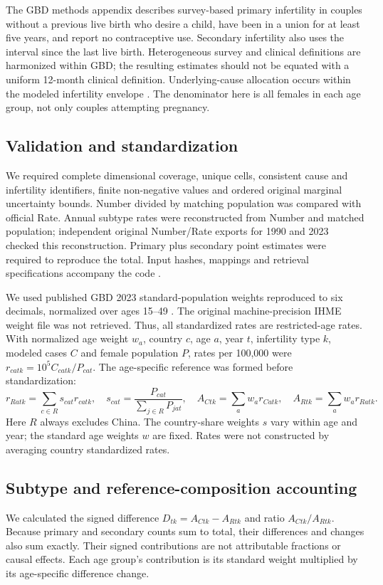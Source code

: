 \documentclass[11pt,a4paper]{article}
\begin{document}
The GBD methods appendix describes survey-based primary infertility in couples without a previous live birth who desire a child, have been in a union for at least five years, and report no contraceptive use. Secondary infertility also uses the interval since the last live birth. Heterogeneous survey and clinical definitions are harmonized within GBD; the resulting estimates should not be equated with a uniform 12-month clinical definition. Underlying-cause allocation occurs within the modeled infertility envelope \cite{gbd}. The denominator here is all females in each age group, not only couples attempting pregnancy.

\subsection{Validation and standardization}
We required complete dimensional coverage, unique cells, consistent cause and infertility identifiers, finite non-negative values and ordered original marginal uncertainty bounds. Number divided by matching population was compared with official Rate. Annual subtype rates were reconstructed from Number and matched population; independent original Number/Rate exports for 1990 and 2023 checked this reconstruction. Primary plus secondary point estimates were required to reproduce the total. Input hashes, mappings and retrieval specifications accompany the code \cite{repository}.

We used published GBD 2023 standard-population weights reproduced to six decimals, normalized over ages 15--49 \cite{chen}. The original machine-precision IHME weight file was not retrieved. Thus, all standardized rates are restricted-age rates. With normalized age weight $w_a$, country $c$, age $a$, year $t$, infertility type $k$, modeled cases $C$ and female population $P$, rates per 100,000 were $r_{catk}=10^5 C_{catk}/P_{cat}$. The age-specific reference was formed before standardization:
\begin{equation}
 r_{Ratk}=\sum_{c\in R}s_{cat}r_{catk},\quad
 s_{cat}=\frac{P_{cat}}{\sum_{j\in R}P_{jat}},\quad
 A_{Ctk}=\sum_a w_a r_{Catk},\quad A_{Rtk}=\sum_a w_a r_{Ratk}.
\end{equation}
Here $R$ always excludes China. The country-share weights $s$ vary within age and year; the standard age weights $w$ are fixed. Rates were not constructed by averaging country standardized rates.

\subsection{Subtype and reference-composition accounting}
We calculated the signed difference $D_{tk}=A_{Ctk}-A_{Rtk}$ and ratio $A_{Ctk}/A_{Rtk}$. Because primary and secondary counts sum to total, their differences and changes also sum exactly. Their signed contributions are not attributable fractions or causal effects. Each age group's contribution is its standard weight multiplied by its age-specific difference change.
\end{document}
